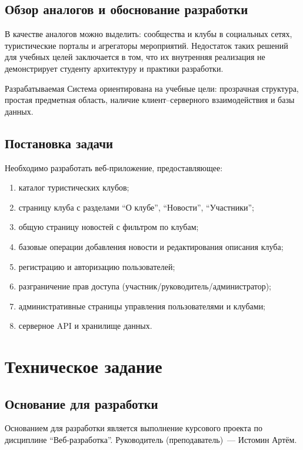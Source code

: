 \documentclass[utf8, russian]{eskdtext}
\let\stdsection\section
\renewcommand \section{\newpage\stdsection}
\begin{document}
\subsection{Обзор аналогов и обоснование разработки}
В качестве аналогов можно выделить: сообщества и клубы в социальных сетях, туристические порталы и агрегаторы мероприятий. Недостаток таких решений для учебных целей заключается в том, что их внутренняя реализация не демонстрирует студенту архитектуру и практики разработки.

Разрабатываемая Система ориентирована на учебные цели: прозрачная структура, простая предметная область, наличие клиент--серверного взаимодействия и базы данных.

\subsection{Постановка задачи}
Необходимо разработать веб-приложение, предоставляющее:
\begin{enumerate}
  \item каталог туристических клубов;
  \item страницу клуба с разделами \textquotedblleft О клубе\textquotedblright , \textquotedblleft Новости\textquotedblright , \textquotedblleft Участники\textquotedblright ;
  \item общую страницу новостей с фильтром по клубам;
  \item базовые операции добавления новости и редактирования описания клуба;
  \item регистрацию и авторизацию пользователей;
  \item разграничение прав доступа (участник/руководитель/администратор);
  \item административные страницы управления пользователями и клубами;
  \item серверное API и хранилище данных.
\end{enumerate}

\section{Техническое задание}
\subsection{Основание для разработки}
Основанием для разработки является выполнение курсового проекта по дисциплине \textquotedblleft Веб-разработка\textquotedblright. Руководитель (преподаватель)~--- Истомин Артём.
\end{document}
